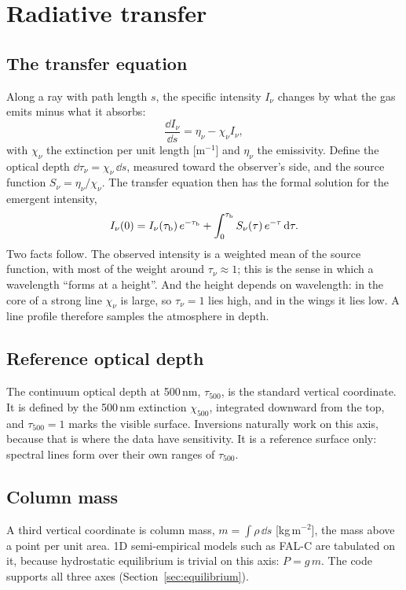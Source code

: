 \section{Radiative transfer}

\subsection{The transfer equation}
Along a ray with path length $s$, the specific intensity $I_\nu$ changes by what the gas emits minus what it absorbs:
\begin{equation}
\frac{\dd I_\nu}{\dd s}=\eta_\nu-\chi_\nu I_\nu ,
\end{equation}
with $\chi_\nu$ the extinction per unit length [m$^{-1}$] and $\eta_\nu$ the emissivity. Define the optical depth $\dd\tau_\nu=\chi_\nu\,\dd s$, measured toward the observer's side, and the source function $S_\nu=\eta_\nu/\chi_\nu$. The transfer equation then has the formal solution for the emergent intensity,
\begin{equation}
I_\nu(0)=I_\nu(\tau_{\rm b})\,e^{-\tau_{\rm b}}+\int_0^{\tau_{\rm b}}S_\nu(\tau)\,e^{-\tau}\,\mathrm{d}\tau .\label{eq:formal}
\end{equation}
Two facts follow. The observed intensity is a weighted mean of the source function, with most of the weight around $\tau_\nu\approx1$; this is the sense in which a wavelength ``forms at a height''. And the height depends on wavelength: in the core of a strong line $\chi_\nu$ is large, so $\tau_\nu=1$ lies high, and in the wings it lies low. A line profile therefore samples the atmosphere in depth.

\subsection{Reference optical depth}
The continuum optical depth at 500\,nm, $\tau_{500}$, is the standard vertical coordinate. It is defined by the 500\,nm extinction $\chi_{500}$, integrated downward from the top, and $\tau_{500}=1$ marks the visible surface. Inversions naturally work on this axis, because that is where the data have sensitivity. It is a reference surface only: spectral lines form over their own ranges of $\tau_{500}$.

\subsection{Column mass}
A third vertical coordinate is column mass, $m=\int\rho\,\dd s$ [kg\,m$^{-2}$], the mass above a point per unit area. 1D semi-empirical models such as FAL-C are tabulated on it, because hydrostatic equilibrium is trivial on this axis: $P=g\,m$. The code supports all three axes (Section~\ref{sec:equilibrium}).


